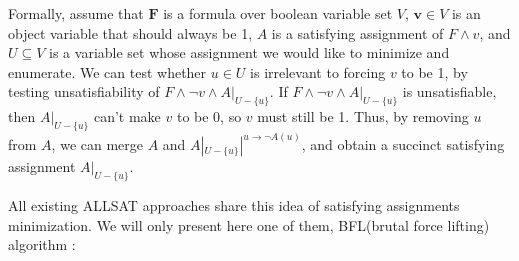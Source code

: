 \documentclass[journal]{IEEEtran}
\begin{document}
Formally,
assume that $\boldsymbol{F}$ is a formula over boolean variable set $V$,
$\boldsymbol{v}\in V$ is an object variable that should always be 1,
$A$ is a satisfying assignment of $F\wedge v$,
and $U\subseteq V$ is a variable set whose assignment we would like to minimize and enumerate.
We can test whether $u\in U$ is irrelevant to forcing $v$ to be 1,
by testing unsatisfiability of $F\wedge \neg v\wedge A|_{U-\{u\}}$.
If $F\wedge \neg v\wedge A|_{U-\{u\}}$ is unsatisfiable,
then $A|_{U-\{u\}}$ can't make $v$ to be 0,
so $v$ must still be 1.
Thus,
by removing $u$ from $A$,
we can merge $A$ and $A|_{U-\{u\}}|^{u\to \neg A(u)}$,
and obtain a succinct satisfying assignment $A|_{U-\{u\}}$.

All existing ALLSAT approaches \cite{PRIMECLAUSE,SATUNBMC,MINASS,EFFCON,MINCEX,MEMEFFALLSAT,REPARAM,EFFSATUSMCCO}
share this idea of satisfying assignments minimization.
We will only present here one of them, BFL(brutal force lifting) algorithm \cite{MINASS}:

\vspace{0.2cm}
\end{document}
